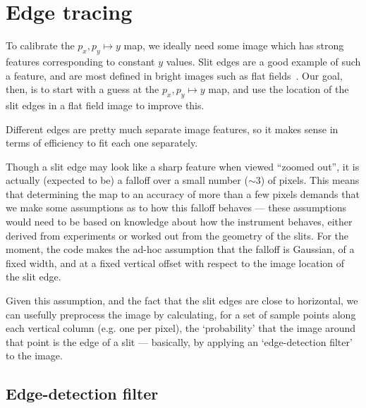 \section{Edge tracing}
\label{sec:edgeTracing}

To calibrate the $p_x, p_y \mapsto y$ map, we ideally need some image
which has strong features corresponding to constant $y$ values. Slit
edges are a good example of such a feature, and are most defined in
bright images such as flat fields~\cite{surfreport}. Our goal, then, is to start with a
guess at the $p_x, p_y \mapsto y$ map, and use the location of the slit
edges in a flat field image to improve this.

Different edges are pretty much separate image features, so it makes
sense in terms of efficiency to fit each one separately.

Though a slit edge may look like a sharp feature when viewed ``zoomed
out'', it is actually (expected to be) a falloff over a small number
($\sim 3$) of pixels. This means that determining the map to an accuracy
of more than a few pixels demands that we make some assumptions as
to how this falloff behaves --- these assumptions would need to be
based on knowledge about how the instrument behaves, either derived
from experiments or worked out from the geometry of the slits. For
the moment, the code makes the ad-hoc assumption that the falloff is
Gaussian, of a fixed width, and at a fixed vertical offset with respect to
the image location of the slit edge.

Given this assumption, and the fact that the slit edges are close to
horizontal, we can usefully preprocess the image by calculating,
for a set of sample points along each vertical column (e.g. one per pixel),
the `probability' that the image around that point is the edge of a slit
--- basically, by applying an `edge-detection filter' to the image.

\subsection{Edge-detection filter}

